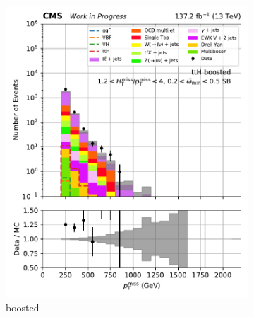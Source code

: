 \begin{figure}[htbp]
    \centering
    \begin{subfigure}[b]{0.24\textwidth}
        \includegraphics[width=\textwidth]{figures/region_plots/2016to18/sideband_1/ttH_boosted.pdf}
        \caption{\ttH boosted}
    \end{subfigure}
    \hfill
    \begin{subfigure}[b]{0.24\textwidth}

\end{subfigure}
\end{figure}
